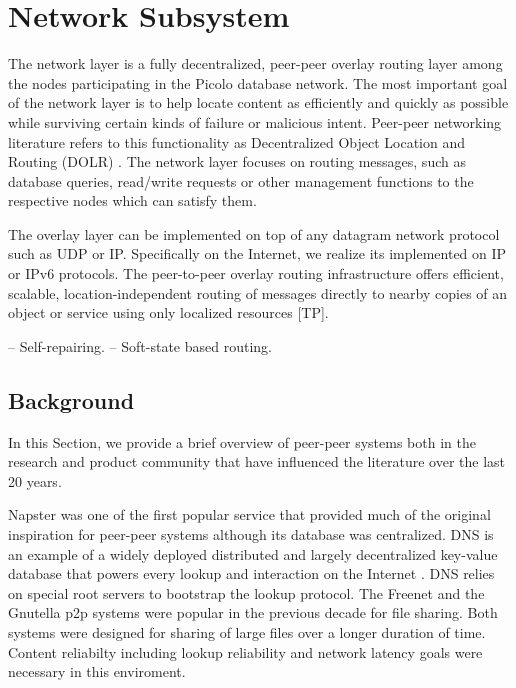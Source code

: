 \section{Network Subsystem} 

The network layer is a fully decentralized, peer-peer overlay routing layer among the nodes participating in the Picolo
database network. The most important goal of the network layer is to help locate content as efficiently and quickly as
possible while surviving certain kinds of failure or malicious intent. Peer-peer networking literature refers to this
functionality as Decentralized Object Location and Routing (DOLR) \cite{dolr2003}. The network layer focuses on routing
messages, such as database queries, read/write requests or other management functions to the respective nodes which can
satisfy them. 

The overlay layer can be implemented on top of any datagram network protocol such as UDP or IP. Specifically on the Internet, we realize its implemented on IP or IPv6 protocols.
The peer-to-peer overlay routing infrastructure offers efficient, scalable, location-independent
routing of messages directly to nearby copies of an object or service using only localized resources [TP].

-- Self-repairing.
-- Soft-state based routing.

\subsection{Background}

In this Section, we provide a brief overview of peer-peer systems both in the research and product community that have
influenced the literature over the last 20 years.

Napster \cite{Napster} was one of the first popular service that provided much of the original inspiration for peer-peer
systems although its database was centralized.  DNS is an example of a widely deployed distributed and largely
decentralized key-value database that powers every lookup and interaction on the Internet \cite{Mockapetris_1988}. DNS
relies on special root servers to bootstrap the lookup protocol. The Freenet \cite{freenet_thesis, Clarke_2001} and the
Gnutella \cite{Gnutella} p2p systems were popular in the previous decade for file sharing. Both systems were designed
for sharing of large files over a longer duration of time. Content reliabilty including lookup reliability and network
latency goals were necessary in this enviroment. 

